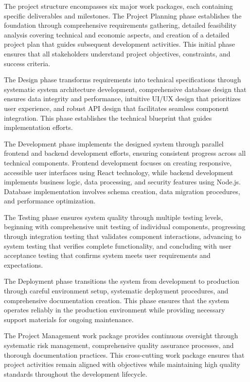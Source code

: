 The project structure encompasses six major work packages, each containing specific deliverables and milestones. The Project Planning phase establishes the foundation through comprehensive requirements gathering, detailed feasibility analysis covering technical and economic aspects, and creation of a detailed project plan that guides subsequent development activities. This initial phase ensures that all stakeholders understand project objectives, constraints, and success criteria.

The Design phase transforms requirements into technical specifications through systematic system architecture development, comprehensive database design that ensures data integrity and performance, intuitive UI/UX design that prioritizes user experience, and robust API design that facilitates seamless component integration. This phase establishes the technical blueprint that guides implementation efforts.

The Development phase implements the designed system through parallel frontend and backend development efforts, ensuring consistent progress across all technical components. Frontend development focuses on creating responsive, accessible user interfaces using React technology, while backend development implements business logic, data processing, and security features using Node.js. Database implementation involves schema creation, data migration procedures, and performance optimization.

The Testing phase ensures system quality through multiple testing levels, beginning with comprehensive unit testing of individual components, progressing through integration testing that validates component interactions, advancing to system testing that verifies complete functionality, and concluding with user acceptance testing that confirms system meets user requirements and expectations.

The Deployment phase transitions the system from development to production through careful environment setup, systematic deployment procedures, and comprehensive documentation creation. This phase ensures that the system operates reliably in the production environment while providing necessary support materials for ongoing maintenance.

The Project Management work package provides continuous oversight through systematic risk management, comprehensive quality assurance processes, and thorough documentation practices. This cross-cutting work package ensures that project activities remain aligned with objectives while maintaining high quality standards throughout the development lifecycle.

